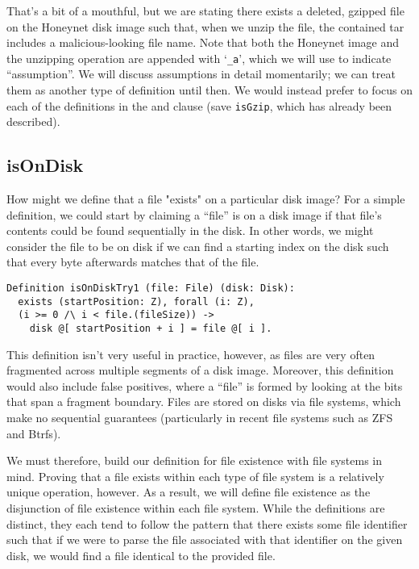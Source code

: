 \documentclass[nocopyrightspace]{sigplanconf}
\begin{document}
That's a bit of a mouthful, but we are stating there exists a deleted, gzipped
file on the Honeynet disk image such that, when we unzip the file, the
contained tar includes a malicious-looking file name. Note that both the
Honeynet image and the unzipping operation are appended with `{\tt \_a}',
which we will use to indicate ``assumption''. We will discuss assumptions in
detail momentarily; we can treat them as another type of definition until
then. We would instead prefer to focus on each of the definitions in the and
clause (save {\tt isGzip}, which has already been described).

\subsection{isOnDisk}

How might we define that a file "exists" on a particular disk image? For a
simple definition, we could start by claiming a ``file'' is on a disk image if
that file's contents could be found sequentially in the disk. In other words,
we might consider the file to be on disk if we can find a starting index on
the disk such that every byte afterwards matches that of the file.

\begin{lstlisting}
Definition isOnDiskTry1 (file: File) (disk: Disk):
  exists (startPosition: Z), forall (i: Z),
  (i >= 0 /\ i < file.(fileSize)) -> 
    disk @[ startPosition + i ] = file @[ i ].
\end{lstlisting}

This definition isn't very useful in practice, however, as files are very
often fragmented across multiple segments of a disk image. Moreover, this
definition would also include false positives, where a ``file'' is formed by
looking at the bits that span a fragment boundary. Files are stored on disks
via file systems, which make no sequential guarantees (particularly in recent
file systems such as ZFS and Btrfs).

We must therefore, build our definition for file existence with file systems
in mind. Proving that a file exists within each type of file system is a
relatively unique operation, however. As a result, we will define file
existence as the disjunction of file existence within each file system. While
the definitions are distinct, they each tend to follow the pattern that there
exists some file identifier such that if we were to parse the file associated
with that identifier on the given disk, we would find a file identical to the
provided file.
\end{document}
